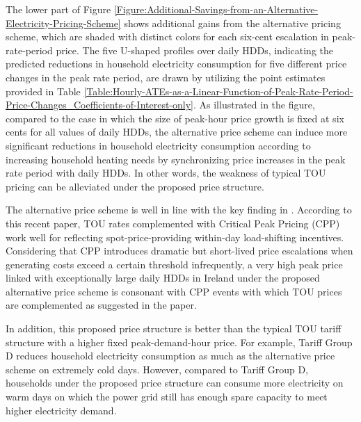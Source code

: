 The lower part of Figure \ref{Figure:Additional-Savings-from-an-Alternative-Electricity-Pricing-Scheme} shows additional gains from the alternative pricing scheme, which are shaded with distinct colors for each six-cent escalation in peak-rate-period price. The five U-shaped profiles over daily HDDs, indicating the predicted reductions in household electricity consumption for five different price changes in the peak rate period, are drawn by utilizing the point estimates provided in Table \ref{Table:Hourly-ATEs-as-a-Linear-Function-of-Peak-Rate-Period-Price-Changes_Coefficients-of-Interest-only}. As illustrated in the figure, compared to the case in which the size of peak-hour price growth is fixed at six cents for all values of daily HDDs, the alternative price scheme can induce more significant reductions in household electricity consumption according to increasing household heating needs by synchronizing price increases in the peak rate period with daily HDDs. In other words, the weakness of typical TOU pricing can be alleviated under the proposed price structure. 

The alternative price scheme is well in line with the key finding in \cite{Electricity-Retail-Rate-Design-in-a-Decarbonized-Economy_Schittekatte-et-al_2022}. According to this recent paper, TOU rates complemented with Critical Peak Pricing (CPP) work well for reflecting spot-price-providing within-day load-shifting incentives. Considering that CPP introduces dramatic but short-lived price escalations when generating costs exceed a certain threshold infrequently, a very high peak price linked with exceptionally large daily HDDs in Ireland under the proposed alternative price scheme is consonant with CPP events with which TOU prices are complemented as suggested in the paper. 

In addition, this proposed price structure is better than the typical TOU tariff structure with a higher fixed peak-demand-hour price. For example, Tariff Group D reduces household electricity consumption as much as the alternative price scheme on extremely cold days. However, compared to Tariff Group D, households under the proposed price structure can consume more electricity on warm days on which the power grid still has enough spare capacity to meet higher electricity demand. 
